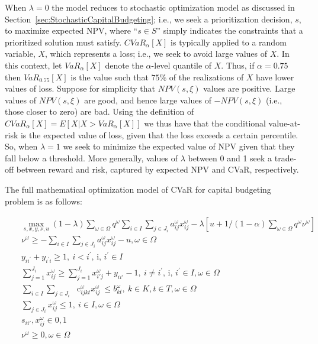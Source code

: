 When $\lambda = 0$ the model reduces to stochastic optimization model as
discussed in Section~\ref{sec:StochasticCapitalBudgeting}; i.e., we seek
a prioritization decision, $s$, to maximize expected NPV, where ``$s \in S$''
simply indicates the constraints that a prioritized solution must satisfy.
$CVaR_\alpha [X]$ is typically applied to a random variable, $X$, which
represents a loss; i.e., we seek to avoid large values of $X$. In this
context, let $VaR_\alpha [X]$ denote the $\alpha$-level quantile of $X$.
Thus, if $\alpha = 0.75$ then $VaR_0.75 [X]$ is the value such that $75\%$
of the realizations of $X$ have lower values of loss. Suppose for simplicity
that $NPV(s, \xi)$ values are positive. Large values of $NPV(s, \xi)$ are
good, and hence large values of $-NPV(s, \xi)$ (i.e., those closer to zero)
are bad. Using the definition of $CVaR_\alpha [X] = E[X|X > VaR_\alpha [X]]$
we thus have that the conditional value-at-risk is the expected value of loss,
given that the loss exceeds a certain percentile. So, when $\lambda = 1$ we
seek to minimize the expected value of NPV given that they fall below a
threshold. More generally, values of $\lambda$ between 0 and 1 seek a trade-off
between reward and risk, captured by expected NPV and CVaR, respectively.

The full mathematical optimization model of CVaR for capital budgeting problem
is as follows:

\begin{subequations}\label{fullDRO}
\begin{eqnarray}
& & \max_{s, x, y, \nu, u} (1-\lambda) \sum _{ \omega  \in  \Omega }^{}q^{ \omega } \sum _{i \in I}^{} \sum _{j \in J_{i}}^{}a_{ij}^{ \omega }x_{ij}^{ \omega } - \lambda[u+1/(1-\alpha)\sum_{\omega \in \Omega} q^\omega \nu^\omega] \\
& & \nu^\omega \ge - \sum _{i \in I}^{} \sum _{j \in J_{i}}^{}a_{ij}^{ \omega }x_{ij}^{ \omega } - u, \omega \in \Omega \\
& & y_{ii^{'}}+y_{i^{'}i} \geq 1,~ i<i^{'}\text{, i, }i^{'} \in I \\
& & \sum_{j=1}^{J_i} x_{ij}^\omega \geq \sum_{j=1}^{J_i} x_{i'j}^\omega + y_{ii'} -1,~ i \neq i^{'}\text{, i, }i^{'} \in I,  \omega  \in  \Omega \\
& & \sum _{i \in I}^{} \sum _{j \in J_{i}}^{}\text{~ c}_{ijkt}^{ \omega }x_{ij}^{ \omega }~  \leq  b_{kt}^{ \omega },~ k \in K, t \in T,  \omega  \in  \Omega \\
& & \sum_{j\in J_i} x_{ij}^{ \omega } \leq 1,~ i \in I, \omega  \in  \Omega \\
& & s_{ii'}, x_{ij}^\omega \in {0, 1} \\
& & \nu^\omega \ge 0, \omega \in \Omega
\end{eqnarray}
\end{subequations}


